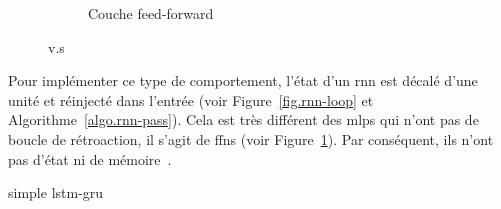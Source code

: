 \begin{figure}[hbt]
\begin{center}
\begin{subfigure}{.4\linewidth}
            \caption{Couche feed-forward}
            \label{fig.ffn-layer}
        \end{subfigure}
    \end{center}
    \caption{ v.s }
    \label{fig.rnn-vs-ffn}
\end{figure}

Pour implémenter ce type de comportement, 
l'état d'un \gls{rnn} est décalé d'une unité et réinjecté dans l'entrée %
(voir Figure~\ref{fig.rnn-loop} et Algorithme~\ref{algo.rnn-pass}).
Cela est très différent des \glspl{mlp} qui n'ont pas de boucle de rétroaction,
il s'agit de \glspl{ffn} (voir Figure~\ref{fig.ffn-layer}).
Par conséquent, ils n'ont pas d'état ni de mémoire~\cite{Fathi_2021}.


{simple}
{lstm-gru}
